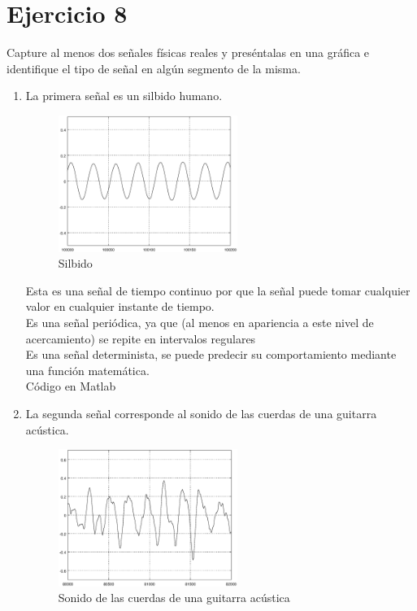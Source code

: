 \documentclass[10pt,a4paper]{report}
\begin{document}
\section{Ejercicio 8}
Capture al menos dos señales físicas reales y preséntalas en una  gráfica e identifique el tipo de señal en algún segmento de la misma.

\begin{enumerate}
  \item La primera señal es un silbido humano.
    \begin{figure}[H]
      \begin{center}
        \includegraphics[width=0.55\textwidth]{Ejercicio8/Silbido}
        \caption{Silbido}
        \label{fig:Slib}
      \end{center}
    \end{figure}
    
Esta es una señal de tiempo continuo por que la señal puede tomar cualquier valor en cualquier instante de tiempo. \\
Es una señal periódica, ya que (al menos en apariencia a este nivel de acercamiento) se repite en intervalos regulares \\
Es una señal determinista, se puede predecir su comportamiento mediante una función matemática.\\
\newline Código en Matlab
    

\item La segunda señal corresponde al sonido de las cuerdas de una guitarra acústica.

\begin{figure}[H]
  \begin{center}
    \includegraphics[width=0.55\textwidth]{Ejercicio8/Guitarra}
    \caption{Sonido de las cuerdas de una guitarra acústica}
    \label{fig:Guitar}
  \end{center}
\end{figure}


\end{enumerate}
\end{document}
